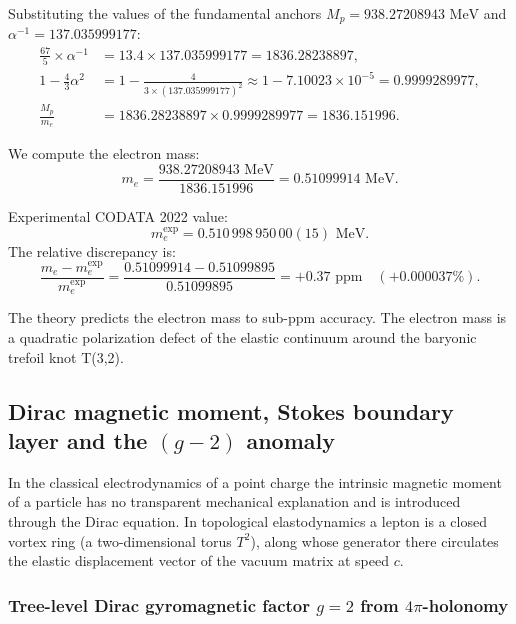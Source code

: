 \documentclass[11pt,a4paper]{article}
\theoremstyle{definition}
\theoremstyle{remark}
\begin{document}
Substituting the values of the fundamental anchors $M_p = 938.27208943\text{ MeV}$ and $\alpha^{-1} = 137.035999177$:
\begin{align}
	\frac{67}{5} \times \alpha^{-1} &= 13.4 \times 137.035999177 = 1836.28238897, \\
	1 - \frac{4}{3}\alpha^2 &= 1 - \frac{4}{3 \times (137.035999177)^2} \approx 1 - 7.10023 \times 10^{-5} = 0.9999289977, \\
	\frac{M_p}{m_e} &= 1836.28238897 \times 0.9999289977 = 1836.151996.
\end{align}
	
We compute the electron mass:
\begin{equation}
	m_e = \frac{938.27208943\text{ MeV}}{1836.151996} = 0.51099914\text{ MeV}.
	\label{eq:electron_mass_numerical_result}
\end{equation}
	
	Experimental CODATA 2022 value:
\begin{equation}
m_e^{\mathrm{exp}} = 0.510\,998\,950\,00(15)\text{ MeV}.
\label{eq:electron_mass_codata_benchmark}
\end{equation}
	The relative discrepancy is:
\begin{equation}
	\frac{m_e - m_e^{\mathrm{exp}}}{m_e^{\mathrm{exp}}} = \frac{0.51099914 - 0.51099895}{0.51099895} = +0.37\text{ ppm} \quad (+0.000037\%).
\end{equation}
	
The theory predicts the electron mass to sub-ppm accuracy. The electron mass is a quadratic polarization defect of the elastic continuum around the baryonic trefoil knot T(3,2).

\subsection{Dirac magnetic moment, Stokes boundary layer and the $(g-2)$ anomaly}

In the classical electrodynamics of a point charge the intrinsic magnetic moment of a particle has no transparent mechanical explanation and is introduced through the Dirac equation. In topological elastodynamics a lepton is a closed vortex ring (a two-dimensional torus $T^2$), along whose generator there circulates the elastic displacement vector of the vacuum matrix at speed $c$.

\subsubsection{Tree-level Dirac gyromagnetic factor $g = 2$ from $4\pi$-holonomy}
\end{document}
